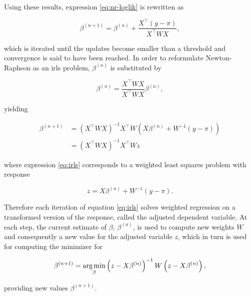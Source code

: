 Using these results, expression \ref{eq:nr-loglik} is rewritten as

\begin{equation}
  \beta^{(n+1)} = \beta^{(n)} + \frac{X^\intercal (y - \pi)}{X^\intercal W X},
\end{equation}

which is iterated until the updates become smaller than a threshold and convergence is said to have been reached. In order to reformulate Newton-Raphson as an \gls{irls} problem, $\beta^{(n)}$ is substituted by

\begin{equation*}
  \beta^{(n)} = \frac{X^\intercal W X}{X^\intercal W X} \beta^{(n)},
\end{equation*}

yielding

\begin{subequations}
\begin{align}
  \beta^{(n+1)} &= \left(X^\intercal W X\right)^{-1} X^\intercal W \left(X \beta^{(n)} + W^{-1} (y - \pi)\right) \\
  &= \left(X^\intercal W X\right)^{-1} X^\intercal W z \label{eq:irls}
\end{align}
\end{subequations}

where expression \ref{eq:irls} corresponds to a weighted least squares problem with response

\begin{equation*}
  z = X \beta^{(n)} + W^{-1} (y - \pi).
\end{equation*}

Therefore each iteration of equation \ref{eq:irls} solves weighted regression on a transformed version of the response, called the adjusted dependent variable. At each step, the current estimate of $\beta$, $\beta^{(n)}$, is used to compute new weights $W$ and consequently a new value for the adjusted variable $z$, which in turn is used for computing the minimizer for

\begin{equation}
  \beta^{(n+1)} = \operatorname*{arg\, min}_{\beta} \left(z-X\beta^{(n)}\right)^{-1} W \left(z-X\beta^{(n)}\right),
\end{equation}

providing new values $\beta^{(n+1)}$.


